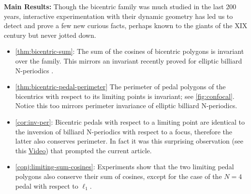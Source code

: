 \textbf{Main Results:}
Though the bicentric family was much studied in the last 200 years, interactive experimentation with their dynamic geometry has led us to detect and prove a few new curious facts, perhaps known to the giants of the XIX century but never jotted down.

\begin{itemize}
    \item \cref{thm:bicentric-sum}: The sum of the cosines of bicentric polygons is invariant over the family. This mirrors an invariant recently proved for elliptic billiard N-periodics \cite{reznik2020-intelligencer,garcia2020-new-properties,akopyan2020-invariants,bialy2020-invariants}.
    \item  \cref{thm:bicentric-pedal-perimeter} The perimeter of pedal polygons of the bicentrics with respect to its limiting points is invariant; see \cref{fig:confocal}. Notice this too mirrors perimeter invariance of elliptic billiard N-periodics.
    \item \cref{cor:inv-per}: Bicentric pedals with respect to a limiting point are identical to the inversion of billiard N-periodics with respect to a focus, therefore the latter also conserves perimeter. In fact it was this surprising observation (see this \href{https://youtu.be/wkstGKq5jOo}{Video}) that prompted the current article.
    \item \cref{conj:limiting-sum-cosines}: Experiments show that the two limiting pedal polygons also conserve their sum of cosines, except for  the case of the $N=4$ pedal with respect to $\ell_1$.
\end{itemize}






